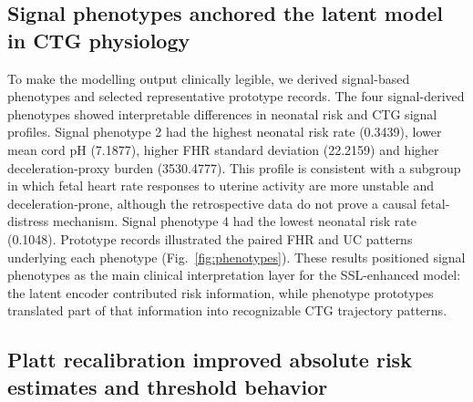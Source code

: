 \documentclass[pdflatex,sn-nature]{sn-jnl}
\begin{document}
\subsection{Signal phenotypes anchored the latent model in CTG physiology}

To make the modelling output clinically legible, we derived signal-based phenotypes and selected representative prototype records. The four signal-derived phenotypes showed interpretable differences in neonatal risk and CTG signal profiles. Signal phenotype 2 had the highest neonatal risk rate (0.3439), lower mean cord pH (7.1877), higher FHR standard deviation (22.2159) and higher deceleration-proxy burden (3530.4777). This profile is consistent with a subgroup in which fetal heart rate responses to uterine activity are more unstable and deceleration-prone, although the retrospective data do not prove a causal fetal-distress mechanism. Signal phenotype 4 had the lowest neonatal risk rate (0.1048). Prototype records illustrated the paired FHR and UC patterns underlying each phenotype (Fig.~\ref{fig:phenotypes}). These results positioned signal phenotypes as the main clinical interpretation layer for the SSL-enhanced model: the latent encoder contributed risk information, while phenotype prototypes translated part of that information into recognizable CTG trajectory patterns.

\subsection{Platt recalibration improved absolute risk estimates and threshold behavior}
\end{document}
